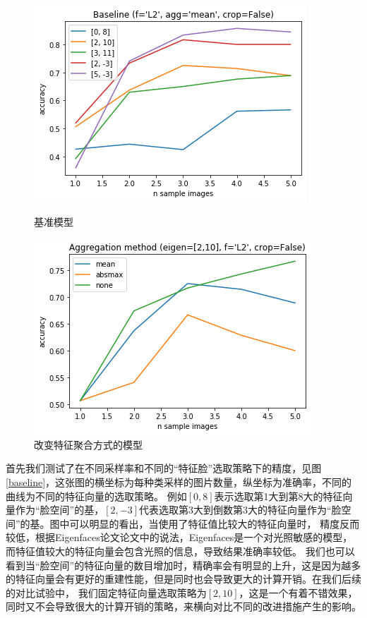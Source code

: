 \documentclass{ctexart}
\begin{document}
\begin{figure}[htbp]
    \begin{minipage}[t]{0.45 \linewidth}
        \centering
        \includegraphics[scale=0.45]{imgs/baseline.png}
        \caption{基准模型}
        \label{baseline}
    \end{minipage}
    \begin{minipage}[t]{0.45 \linewidth}
        \centering
        \includegraphics[scale=0.45]{imgs/agg.png}
        \caption{改变特征聚合方式的模型}
        \label{agg}
    \end{minipage}
\end{figure}
首先我们测试了在不同采样率和不同的“特征脸”选取策略下的精度，见图\ref{baseline}，这张图的横坐标为每种类采样的图片数量，纵坐标为准确率，不同的曲线为不同的特征向量的选取策略。
例如$[0,8]$表示选取第1大到第8大的特征向量作为“脸空间”的基，$[2,-3]$代表选取第3大到倒数第3大的特征向量作为“脸空间”的基。图中可以明显的看出，当使用了特征值比较大的特征向量时，
精度反而较低，根据Eigenfaces论文\cite{doi:10.1162/jocn.1991.3.1.71}论文中的说法，Eigenfaces是一个对光照敏感的模型，而特征值较大的特征向量会包含光照的信息，导致结果准确率较低。
我们也可以看到当“脸空间”的特征向量的数目增加时，精确率会有明显的上升，这是因为越多的特征向量会有更好的重建性能，但是同时也会导致更大的计算开销。在我们后续的对比试验中，
我们固定特征向量选取策略为$[2,10]$，这是一个有着不错效果，同时又不会导致很大的计算开销的策略，来横向对比不同的改进措施产生的影响。
\end{document}

